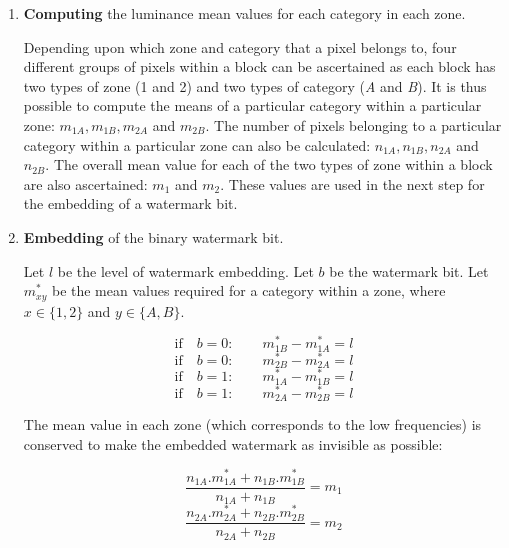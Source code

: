 \documentclass[12pt]{report}
\begin{document}
\begin{enumerate}
	\item {\bf Computing} the luminance mean values for each category in each zone.

		Depending upon which zone and category that a pixel belongs to, four different groups of pixels within a block can be 
		ascertained as each block has two types of zone (1 and 2) and two types of category (\emph{A} and \emph{B}). 
		It is thus possible to compute the means of a particular category within a particular zone:
		$m_{1A}, m_{1B}, m_{2A}$ and $m_{2B}$. 
		The number of pixels belonging to a particular category within a particular zone can also be calculated:
		$n_{1A}, n_{1B}, n_{2A}$ and $n_{2B}$. 
		The overall mean value for each of the two types of zone within a block are also ascertained:
		$m_{1}$ and $m_{2}$. These values are used in the next step for the embedding of a watermark bit.
	


	\item {\bf Embedding} of the binary watermark bit. 
	
	Let $l$ be the level of watermark embedding. Let $b$ be the watermark bit.
	Let $m_{xy}^{*}$ be the mean values required for a category within a zone, where
	$x \in \{1,2\}$ and $y \in \{A,B\}$.
	
	\begin{equation}
	\label{eq:embed1}
		\mbox{if} \quad b=0: \quad \quad m_{1B}^{*} - m_{1A}^{*} = l
	\end{equation}
	\begin{equation}
	\label{eq:embed2}
		\mbox{if} \quad b=0: \quad \quad m_{2B}^{*} - m_{2A}^{*} = l
	\end{equation}
	\begin{equation}
	\label{eq:embed3}
		\mbox{if} \quad b=1: \quad \quad m_{1A}^{*} - m_{1B}^{*} = l
	\end{equation}
	\begin{equation}
	\label{eq:embed4}
		\mbox{if} \quad b=1: \quad \quad m_{2A}^{*} - m_{2B}^{*} = l
	\end{equation}
	
	The mean value in each zone (which corresponds to the low frequencies) is conserved to make the 
	embedded watermark as invisible as possible:

	\begin{equation}
	\label{eq:embed5}
		\frac{ n_{1A} . m_{1A}^{*} + n_{1B} . m_{1B}^{*}}  {n_{1A} + n_{1B}} = m_{1}
	\end{equation}
	\begin{equation}
	\label{eq:embed6}
		\frac{ n_{2A} . m_{2A}^{*} + n_{2B} . m_{2B}^{*}}  {n_{2A} + n_{2B}} = m_{2}
	\end{equation}


\end{enumerate}
\end{document}
